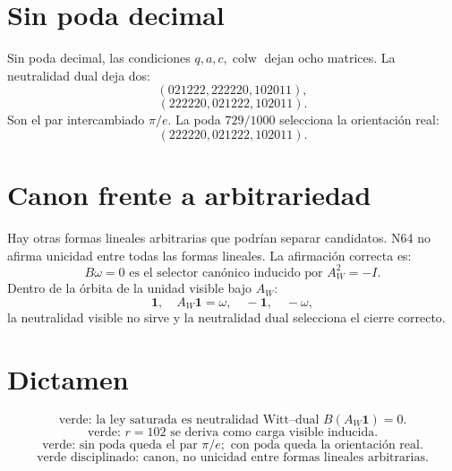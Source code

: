 \documentclass[11pt,a4paper]{article}
\begin{document}
\section{Sin poda decimal}
Sin poda decimal, las condiciones \(q,a,c,\operatorname{colw}\) dejan ocho matrices. La neutralidad dual deja dos:
\[
(021222,222220,102011),
\]
\[
(222220,021222,102011).
\]
Son el par intercambiado \(\pi/e\). La poda \(729/1000\) selecciona la orientación real:
\[
(222220,021222,102011).
\]
\section{Canon frente a arbitrariedad}
Hay otras formas lineales arbitrarias que podrían separar candidatos. N64 no afirma unicidad entre todas las formas lineales. La afirmación correcta es:
\[
\boxed{B\omega=0\text{ es el selector canónico inducido por }A_W^2=-I.}
\]
Dentro de la órbita de la unidad visible bajo \(A_W\):
\[
\mathbf1,\quad A_W\mathbf1=\omega,\quad -\mathbf1,\quad -\omega,
\]
la neutralidad visible no sirve y la neutralidad dual selecciona el cierre correcto.
\section{Dictamen}
\[
\boxed{\text{verde: la ley saturada es neutralidad Witt--dual }B(A_W\mathbf1)=0.}
\]
\[
\boxed{\text{verde: }r=102\text{ se deriva como carga visible inducida.}}
\]
\[
\boxed{\text{verde: sin poda queda el par }\pi/e;\text{ con poda queda la orientación real.}}
\]
\[
\boxed{\text{verde disciplinado: canon, no unicidad entre formas lineales arbitrarias.}}
\]
\end{document}
